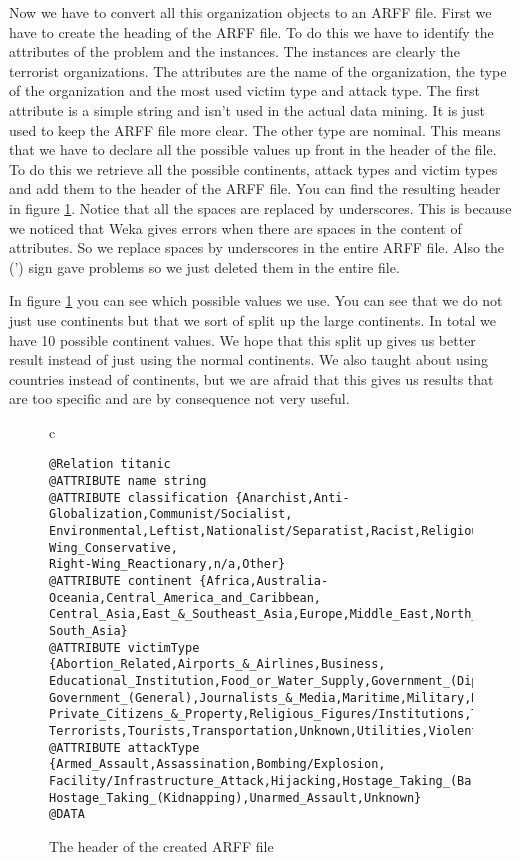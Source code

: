 \documentclass[a4]{article}
\begin{document}
Now we have to convert all this organization objects to an ARFF file. First we have to create the heading of the ARFF file. To do this we have to identify the attributes of the problem and the instances. The instances are clearly the terrorist organizations. The attributes are the name of the organization, the type of the organization and the most used victim type and attack type. The first attribute is a simple string and isn't used in the actual data mining. It is just used to keep the ARFF file more clear. The other type are nominal. This means that we have to declare all the possible values up front in the header of the file. To do this we retrieve all the possible continents, attack types and victim types and add them to the header of the ARFF file. You can find the resulting header in figure \ref{fig:arff_header}. Notice that all the spaces are replaced by underscores. This is because we noticed that Weka gives errors when there are spaces in the content of attributes. So we replace spaces by underscores in the entire ARFF file. Also the (') sign gave problems so we just deleted them in the entire file.\par
In figure \ref{fig:arff_header} you can see which possible values we use. You can see that we do not just use continents but that we sort of split up the large continents. In total we have 10 possible continent values. We hope that this split up gives us better result instead of just using the normal continents. We also taught about using countries instead of continents, but we are afraid that this gives us results that are too specific and are by consequence not very useful.
\begin{figure}[!ht]
\centering
\begin{tabular}{c}
\begin{lstlisting}
@Relation titanic
@ATTRIBUTE name string
@ATTRIBUTE classification {Anarchist,Anti-Globalization,Communist/Socialist,
Environmental,Leftist,Nationalist/Separatist,Racist,Religious,Right-Wing_Conservative,
Right-Wing_Reactionary,n/a,Other}
@ATTRIBUTE continent {Africa,Australia-Oceania,Central_America_and_Caribbean,
Central_Asia,East_&_Southeast_Asia,Europe,Middle_East,North_America,South_America,
South_Asia}
@ATTRIBUTE victimType {Abortion_Related,Airports_&_Airlines,Business,
Educational_Institution,Food_or_Water_Supply,Government_(Diplomatic),
Government_(General),Journalists_&_Media,Maritime,Military,NGO,Other,Police,
Private_Citizens_&_Property,Religious_Figures/Institutions,Telecommunication,
Terrorists,Tourists,Transportation,Unknown,Utilities,Violent_Political_Party}
@ATTRIBUTE attackType {Armed_Assault,Assassination,Bombing/Explosion,
Facility/Infrastructure_Attack,Hijacking,Hostage_Taking_(Barricade_Incident),
Hostage_Taking_(Kidnapping),Unarmed_Assault,Unknown}
@DATA
\end{lstlisting}
\end{tabular}
\caption{The header of the created ARFF file}
\label{fig:arff_header}
\end{figure}\par
\end{document}
